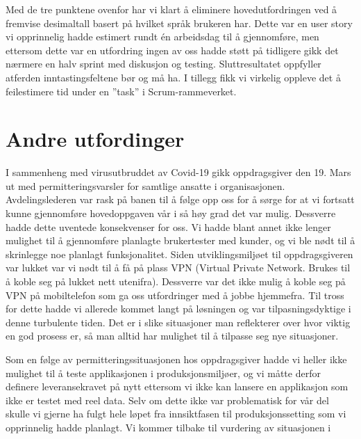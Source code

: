 Med de tre punktene ovenfor har vi klart å eliminere hovedutfordringen ved å fremvise desimaltall basert på hvilket språk brukeren har. Dette var en user story vi opprinnelig hadde estimert rundt én arbeidsdag til å gjennomføre, men ettersom dette var en utfordring ingen av oss hadde støtt på tidligere gikk det nærmere en halv sprint med diskusjon og testing. Sluttresultatet oppfyller atferden inntastingsfeltene bør og må ha. I tillegg fikk vi virkelig oppleve det å feilestimere tid under en ''task'' i Scrum-rammeverket.




\section{\textbf{Andre utfordinger}} \label{Andre_utfordringer}

I sammenheng med virusutbruddet av Covid-19 gikk oppdragsgiver den 19. Mars ut med permitteringsvarsler for samtlige ansatte i organisasjonen. Avdelingslederen var rask på banen til å følge opp oss for å sørge for at vi fortsatt kunne gjennomføre hovedoppgaven vår i så høy grad det var mulig. Dessverre hadde dette uventede konsekvenser for oss. Vi hadde blant annet ikke lenger mulighet til å gjennomføre planlagte brukertester med kunder, og vi ble nødt til å skrinlegge noe planlagt funksjonalitet. Siden utviklingsmiljøet til oppdragsgiveren var lukket var vi nødt til å få på plass VPN (Virtual Private Network. Brukes til å koble seg på lukket nett utenifra). Dessverre var det ikke mulig å koble seg på VPN på mobiltelefon som ga oss utfordringer med å jobbe hjemmefra. Til tross for dette hadde vi allerede kommet langt på løsningen og var tilpasningsdyktige i denne turbulente tiden. Det er i slike situasjoner man reflekterer over hvor viktig en god prosess er, så man alltid har mulighet til å tilpasse seg nye situasjoner.

Som en følge av permitteringssituasjonen hos oppdragsgiver hadde vi heller ikke mulighet til å teste applikasjonen i produksjonsmiljøer, og vi måtte derfor definere leveransekravet på nytt ettersom vi ikke kan lansere en applikasjon som ikke er testet med reel data. Selv om dette ikke var problematisk for vår del skulle vi gjerne ha fulgt hele løpet fra innsiktfasen til produksjonssetting som vi opprinnelig hadde planlagt. Vi kommer tilbake til vurdering av situasjonen i 

